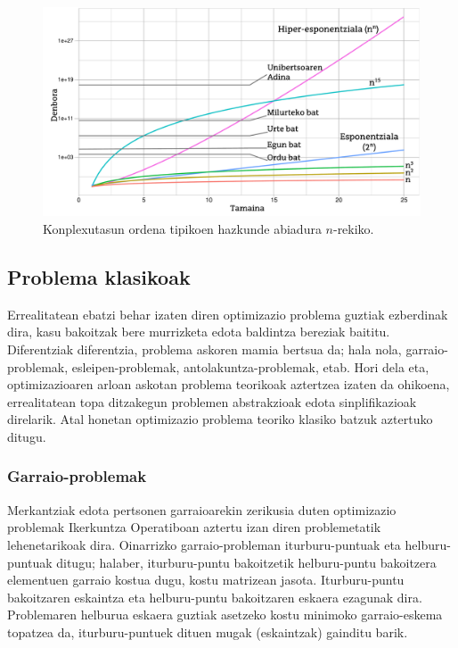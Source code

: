 \documentclass[eu]{ifirak}\usepackage[]{graphicx}\usepackage[]{color}
\begin{document}
\begin{figure}[t]
\centering
\includegraphics[width=\linewidth]{./Irudiak/complexity_orders}
\caption{Konplexutasun ordena tipikoen hazkunde abiadura $n$-rekiko.}
\label{fig:complexity_orders}
\end{figure}

\subsection{Problema klasikoak}

Errealitatean ebatzi behar izaten diren optimizazio problema guztiak ezberdinak dira, kasu bakoitzak bere murrizketa edota baldintza bereziak baititu. Diferentziak diferentzia, problema askoren mamia bertsua da; hala nola, garraio-problemak, esleipen-problemak, antolakuntza-problemak, etab. Hori dela eta, optimizazioaren arloan askotan problema teorikoak aztertzea izaten da ohikoena, errealitatean topa ditzakegun problemen abstrakzioak edota sinplifikazioak direlarik. Atal honetan optimizazio problema teoriko klasiko batzuk aztertuko ditugu. %

\subsubsection{Garraio-problemak}\label{sec:tsp}

Merkantziak edota pertsonen garraioarekin zerikusia duten optimizazio problemak Ikerkuntza Operatiboan aztertu izan diren problemetatik lehenetarikoak dira. Oinarrizko garraio-probleman iturburu-puntuak eta helburu-puntuak ditugu; halaber, iturburu-puntu bakoitzetik helburu-puntu bakoitzera elementuen garraio kostua dugu, kostu matrizean jasota. Iturburu-puntu bakoitzaren eskaintza eta helburu-puntu bakoitzaren eskaera ezagunak dira. Problemaren helburua eskaera guztiak asetzeko kostu minimoko garraio-eskema topatzea da, iturburu-puntuek dituen mugak (eskaintzak) gainditu barik. 
\end{document}
